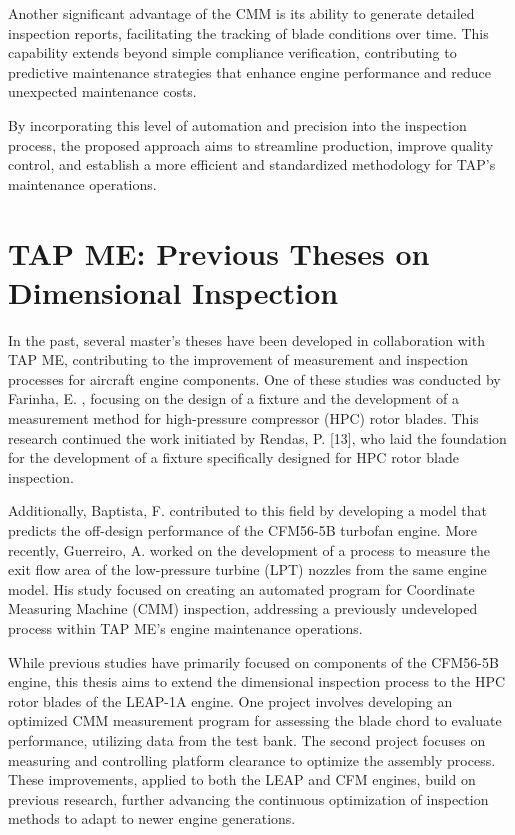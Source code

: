 Another significant advantage of the \gls{CMM} is its ability to generate detailed inspection reports, facilitating the tracking of blade conditions over time. This capability extends beyond simple compliance verification, contributing to predictive maintenance strategies that enhance engine performance and reduce unexpected maintenance costs.

By incorporating this level of automation and precision into the inspection process, the proposed approach aims to streamline production, improve quality control, and establish a more efficient and standardized methodology for \gls{TAP}’s maintenance operations.

\section{TAP ME: Previous Theses on Dimensional Inspection}
\label{sec:before}

In the past, several master's theses have been developed in collaboration with \gls{TAP} \gls{ME}, contributing to the improvement of measurement and inspection processes for aircraft engine components. One of these studies was conducted by Farinha, E. \cite{Farinha2021}, focusing on the design of a fixture and the development of a measurement method for high-pressure compressor (HPC) rotor blades. This research continued the work initiated by Rendas, P. [13], who laid the foundation for the development of a fixture specifically designed for HPC rotor blade inspection.

Additionally, Baptista, F. \cite{rendas2021fixture} contributed to this field by developing a model that predicts the off-design performance of the CFM56-5B turbofan engine. More recently, Guerreiro, A. \cite{guerreiro} worked on the development of a process to measure the exit flow area of the low-pressure turbine (LPT) nozzles from the same engine model. His study focused on creating an automated program for Coordinate Measuring Machine (CMM) inspection, addressing a previously undeveloped process within \gls{TAP} \gls{ME}’s engine maintenance operations.

While previous studies have primarily focused on components of the CFM56-5B engine, this thesis aims to extend the dimensional inspection process to the HPC rotor blades of the LEAP-1A engine. One project involves developing an optimized CMM measurement program for assessing the blade chord to evaluate performance, utilizing data from the test bank. The second project focuses on measuring and controlling platform clearance to optimize the assembly process. These improvements, applied to both the LEAP and CFM engines, build on previous research, further advancing the continuous optimization of inspection methods to adapt to newer engine generations.

